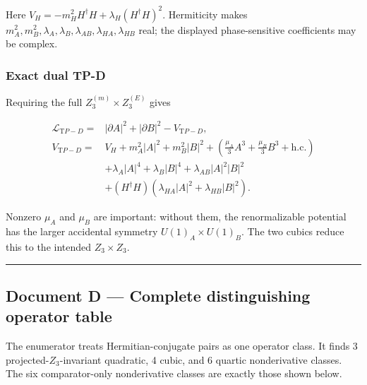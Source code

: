 \documentclass[
]{article}
\begin{document}
Here \(V_H=-m_H^2H^\dagger H+\lambda_H(H^\dagger H)^2\). Hermiticity
makes
\(m_A^2,m_B^2,\lambda_A,\lambda_B,\lambda_{AB},\lambda_{HA},\lambda_{HB}\)
real; the displayed phase-sensitive coefficients may be complex.

\hypertarget{exact-dual-tp-d}{%
\subsubsection{Exact dual TP-D}\label{exact-dual-tp-d}}

Requiring the full \(Z_3^{(m)}\times Z_3^{(E)}\) gives

\[
\begin{aligned}
\mathcal L_{\mathrm TP-D}={}&|\partial A|^2+|\partial B|^2-V_{\mathrm TP-D},\\
V_{\mathrm TP-D}={}&V_H+m_A^2|A|^2+m_B^2|B|^2
+\left(\frac{\mu_A}{3}A^3+\frac{\mu_B}{3}B^3+\mathrm{h.c.}\right)\\
&+\lambda_A|A|^4+\lambda_B|B|^4+\lambda_{AB}|A|^2|B|^2\\
&+(H^\dagger H)(\lambda_{HA}|A|^2+\lambda_{HB}|B|^2).
\end{aligned}
\]

Nonzero \(\mu_A\) and \(\mu_B\) are important: without them, the
renormalizable potential has the larger accidental symmetry
\(U(1)_A\times U(1)_B\). The two cubics reduce this to the intended
\(Z_3\times Z_3\).

\begin{center}\rule{0.5\linewidth}{0.5pt}\end{center}

\hypertarget{document-d-complete-distinguishing-operator-table}{%
\subsection{Document D --- Complete distinguishing operator
table}\label{document-d-complete-distinguishing-operator-table}}

The enumerator treats Hermitian-conjugate pairs as one operator class.
It finds 3 projected-\(Z_3\)-invariant quadratic, 4 cubic, and 6 quartic
nonderivative classes. The six comparator-only nonderivative classes are
exactly those shown below.
\end{document}
